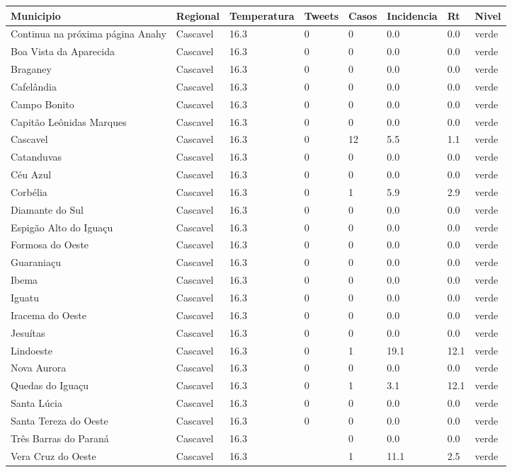 \begin{longtable}{l|lllllll}
  \hline
Municipio & Regional & Temperatura & Tweets & Casos & Incidencia & Rt & Nivel \\ 
  \hline
\endhead
\hline
{\footnotesize Continua na próxima página}
\endfoot
\endlastfoot
Anahy & Cascavel & 16.3 & 0 & 0 & 0.0 & 0.0 & verde \\ 
  Boa Vista da Aparecida & Cascavel & 16.3 & 0 & 0 & 0.0 & 0.0 & verde \\ 
  Braganey & Cascavel & 16.3 & 0 & 0 & 0.0 & 0.0 & verde \\ 
  Cafelândia & Cascavel & 16.3 & 0 & 0 & 0.0 & 0.0 & verde \\ 
  Campo Bonito & Cascavel & 16.3 & 0 & 0 & 0.0 & 0.0 & verde \\ 
  Capitão Leônidas Marques & Cascavel & 16.3 & 0 & 0 & 0.0 & 0.0 & verde \\ 
  Cascavel & Cascavel & 16.3 & 0 & 12 & 5.5 & 1.1 & verde \\ 
  Catanduvas & Cascavel & 16.3 & 0 & 0 & 0.0 & 0.0 & verde \\ 
  Céu Azul & Cascavel & 16.3 & 0 & 0 & 0.0 & 0.0 & verde \\ 
  Corbélia & Cascavel & 16.3 & 0 & 1 & 5.9 & 2.9 & verde \\ 
  Diamante do Sul & Cascavel & 16.3 & 0 & 0 & 0.0 & 0.0 & verde \\ 
  Espigão Alto do Iguaçu & Cascavel & 16.3 & 0 & 0 & 0.0 & 0.0 & verde \\ 
  Formosa do Oeste & Cascavel & 16.3 & 0 & 0 & 0.0 & 0.0 & verde \\ 
  Guaraniaçu & Cascavel & 16.3 & 0 & 0 & 0.0 & 0.0 & verde \\ 
  Ibema & Cascavel & 16.3 & 0 & 0 & 0.0 & 0.0 & verde \\ 
  Iguatu & Cascavel & 16.3 & 0 & 0 & 0.0 & 0.0 & verde \\ 
  Iracema do Oeste & Cascavel & 16.3 & 0 & 0 & 0.0 & 0.0 & verde \\ 
  Jesuítas & Cascavel & 16.3 & 0 & 0 & 0.0 & 0.0 & verde \\ 
  Lindoeste & Cascavel & 16.3 & 0 & 1 & 19.1 & 12.1 & verde \\ 
  Nova Aurora & Cascavel & 16.3 & 0 & 0 & 0.0 & 0.0 & verde \\ 
  Quedas do Iguaçu & Cascavel & 16.3 & 0 & 1 & 3.1 & 12.1 & verde \\ 
  Santa Lúcia & Cascavel & 16.3 & 0 & 0 & 0.0 & 0.0 & verde \\ 
  Santa Tereza do Oeste & Cascavel & 16.3 & 0 & 0 & 0.0 & 0.0 & verde \\ 
  Três Barras do Paraná & Cascavel & 16.3 &  & 0 & 0.0 & 0.0 & verde \\ 
  Vera Cruz do Oeste & Cascavel & 16.3 &  & 1 & 11.1 & 2.5 & verde \\ 
  \hline
\end{longtable}
